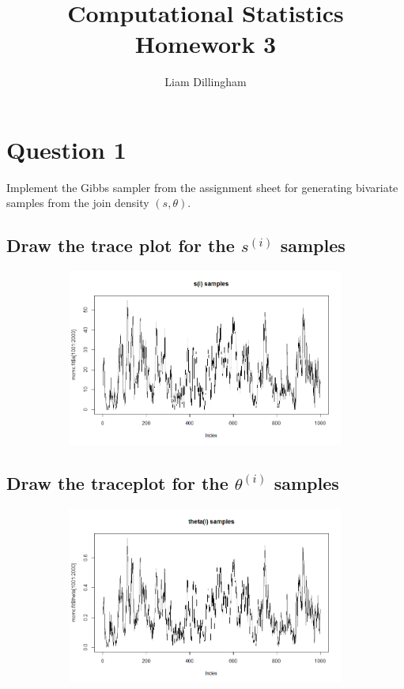 \documentclass[20pt]{article} %
\title{Computational Statistics Homework 3}
\author{Liam Dillingham}
\begin{document}
\maketitle

\section{Question 1} 
Implement the Gibbs sampler from the assignment sheet for generating bivariate samples from the join density $(s, \theta)$. 
\subsection{Draw the trace plot for the $s^{(i)}$ samples}
\begin{figure}[!htbp]
  	\centering
   	\begin{subfigure}[p]{0.9\linewidth}
    	\includegraphics[width=\linewidth]{./figures/hw3-01.png}
   	\end{subfigure}
\end{figure} 
\newpage
\subsection{Draw the traceplot for the $\theta^{(i)}$ samples}
\begin{figure}[!htbp]
  	\centering
   	\begin{subfigure}[p]{0.9\linewidth}
    	\includegraphics[width=\linewidth]{./figures/hw3-02.png}
   	\end{subfigure}
\end{figure} 
\end{document}
